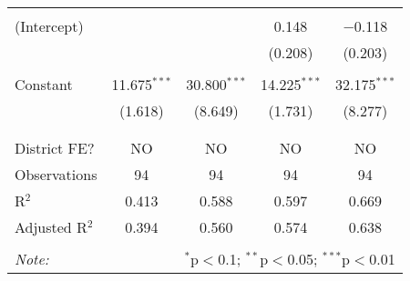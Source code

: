 \documentclass[10pt,a4paper]{article}
\begin{document}
\begin{table}[!htbp]
\begin{tabular}{@{\extracolsep{5pt}}lcccc}
  & & & & \\ 
 (Intercept) &  &  & 0.148 & $-$0.118 \\ 
  &  &  & (0.208) & (0.203) \\ 
  & & & & \\ 
 Constant & 11.675$^{***}$ & 30.800$^{***}$ & 14.225$^{***}$ & 32.175$^{***}$ \\ 
  & (1.618) & (8.649) & (1.731) & (8.277) \\ 
  & & & & \\ 
\hline \\[-1.8ex] 
District FE? & NO & NO & NO & NO \\ 
Observations & 94 & 94 & 94 & 94 \\ 
R$^{2}$ & 0.413 & 0.588 & 0.597 & 0.669 \\ 
Adjusted R$^{2}$ & 0.394 & 0.560 & 0.574 & 0.638 \\ 
\hline 
\hline \\[-1.8ex] 
\textit{Note:}  & \multicolumn{4}{r}{$^{*}$p$<$0.1; $^{**}$p$<$0.05; $^{***}$p$<$0.01} \\ 
\end{tabular} 
\end{table} 
\end{document}
